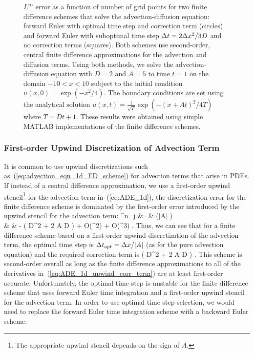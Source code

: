 \documentclass[oneeqnum,onefignum,onetabnum,onethmnum]{siamltex}
\begin{document}
\begin{figure}[tb]
\begin{center}
\caption{$L^\infty$ error as a function of number of grid points for 
two finite difference schemes that solve the advection-diffusion 
equation: forward Euler with optimal time step and correction term (circles) 
and forward Euler with suboptimal time step $\Delta t = 2\Delta x^2/3D$ and no correction 
terms (squares).  Both schemes use second-order, central finite difference 
approximations for the advection and diffusion terms.
Using both methods, we solve the advection-diffusion equation with $D = 2$
and $A = 5$ to time $t = 1$ on the domain $-10 < x < 10$ subject to the 
initial condition $u(x,0) = \exp(-x^2/4)$.  The boundary conditions are set 
using the analytical solution 
$u(x,t) = \frac{1}{\sqrt{T}} \exp \left( -(x+At)^2/4T \right)$
where $T = Dt+1$.
These results were obtained using simple MATLAB implementations of the 
finite difference schemes.
}
\label{fig:ADE_1d_error}
\end{center}
\end{figure}


\subsubsection*{First-order Upwind Discretization of Advection Term}
It is common to use upwind discretizations such 
as~(\ref{eq:advection_eqn_1d_FD_scheme}) for advection terms that arise
in PDEs.  If instead of a central difference approximation, we use a
first-order upwind stencil\footnote{The appropriate upwind stencil depends
on the sign of $A$.} for the advection term in~(\ref{eq:ADE_1d}), the 
discretization error for the finite difference scheme is dominated by the 
first-order error introduced by the upwind stencil for the advection term:
\bea
  \tau^n_j &=&
       (|A| \dt)
  \nonumber \\
   & & 
    -  
      \left( D^2   
           + 2 A D 
      \right)
      + O(\dt \dx^2) + O(\dt^3)
  \label{eq:ADE_1d_upwind_err_eqn}.
\eea
Thus, we can see that for a finite difference scheme based on a first-order
upwind discretization of the advection term, the optimal time step is 
$\Delta t_{opt} = \Delta x/|A|$ (as for the pure advection equation) and the required
correction term is
\beq
      \left( D^2   
           + 2 A D 
      \right)
  \label{eq:ADE_1d_upwind_corr_term}.
\eeq
This scheme is second-order overall as long as the finite difference 
approximations to all of the derivatives in~(\ref{eq:ADE_1d_upwind_corr_term})
are at least first-order accurate.  Unfortunately, the optimal time step 
is unstable for the finite difference scheme that uses forward Euler time 
integration and a first-order upwind stencil for the advection term.  
In order to use optimal time step selection, we would need to replace the 
forward Euler time integration scheme with a backward Euler scheme. 
\end{document}
